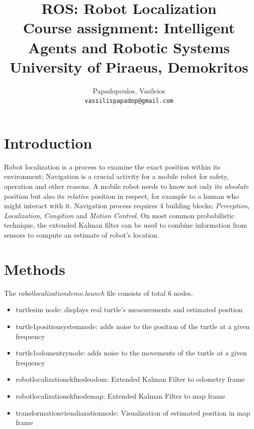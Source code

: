 \documentclass[10pt,a4paper,twocolumn]{article}
\title{%
	ROS: Robot Localization \\
	\large Course assignment: Intelligent Agents and Robotic Systems \\
	University of Piraeus, Demokritos}
\author{
	Papadopoulos, Vasileios\\
	\texttt{vassilispapadop@gmail.com}
}
\begin{document}
\maketitle
	
\section{Introduction}
Robot localization is a process to examine the exact position within its environment; Navigation is a crucial activity for a mobile robot for safety, operation and other reasons. A mobile robot needs to know not only its \textit{absolute} position but also its \textit{relative} position in respect, for example to a human who might interact with it. Navigation process requires 4 building blocks; \textit{Perception}, \textit{Localization}, \textit{Congition} and \textit{Motion Control}. On most common probabilistic technique, the extended Kalman filter can be used to combine information from sensors to compute an estimate of robot's location.


\section{Methods}

The \textit{robot\textunderscore localization\textunderscore demo.launch} file consists of total 6 nodes.

\begin{itemize}
	\item turtlesim node: displays real turtle's measurements and estimated position
	\item turtle1\textunderscore position\textunderscore system\textunderscore node: adds noise to the position of the turtle at a given frequency
	\item turtle1\textunderscore odomentry\textunderscore node: adds noise to the movements of the turtle at a given frequency
	\item robot\textunderscore localization\textunderscore ekf\textunderscore node\textunderscore odom: Extended Kalman Filter to odometry frame
	\item robot\textunderscore localization\textunderscore ekf\textunderscore node\textunderscore map: Extended Kalman Filter to map frame
	\item transformation\textunderscore visualiazation\textunderscore node: Visualization of estimated position in map frame
\end{itemize}
\end{document}
